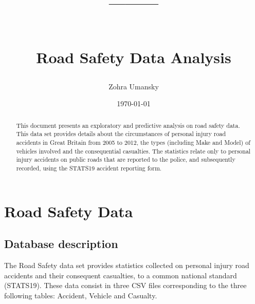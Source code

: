 \documentclass{article}
\title{\begin{large} ---------\end{large}  \\ 
\textbf{Road Safety Data Analysis}}
\author{Zohra Umansky\\}
\date{\today}
\begin{document}
\maketitle



\begin{abstract}
This document presents an exploratory and predictive analysis on road safety data. This data set provides details about the circumstances of personal injury road accidents in Great Britain from 2005 to 2012, the types (including Make and Model) of vehicles involved and the consequential casualties. The statistics relate only to personal injury accidents on public roads that are reported to the police, and subsequently recorded, using the STATS19 accident reporting form.

\end{abstract}
\thispagestyle{empty}

\newpage

\tableofcontents

\newpage


\section{Road Safety Data} \label{sec:intro}

\subsection{Database description}
The Road Safety data set provides statistics collected on personal injury road accidents and their consequent casualties, to a common national standard (STATS19). These data consist in three CSV files corresponding to the three following tables: Accident, Vehicle and Casualty. 
\end{document}
